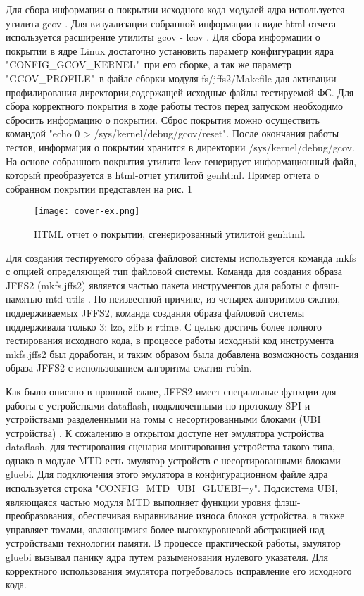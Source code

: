 Для сбора информации о покрытии исходного кода модулей ядра используется утилита gcov \cite{gcov}. Для визуализации собранной информации в виде html отчета используется расширение утилиты gcov - lcov \cite{lcov}. Для сбора информации о покрытии в ядре Linux достаточно установить параметр конфигурации ядра "CONFIG\_GCOV\_KERNEL"\ при его сборке, а так же параметр "GCOV\_PROFILE"\ в файле сборки модуля fs/jffs2/Makefile для активации профилирования директории,содержащей исходные файлы тестируемой ФС. Для сбора корректного покрытия в ходе работы тестов перед запуском необходимо сбросить информацию о покрытии. Сброс покрытия можно осуществить командой  "echo 0 > /sys/kernel/debug/gcov/reset". После окончания работы тестов, информация о покрытии хранится в директории /sys/kernel/debug/gcov. На основе собранного покрытия утилита lcov генерирует информационный файл, который преобразуется в html-отчет утилитой genhtml. Пример отчета о собранном покрытии представлен на рис. \ref{coverexample}

\begin{figure}[H]
	\centering
	\texttt{[image: cover-ex.png]}
	\caption{HTML отчет о покрытии, сгенерированный утилитой genhtml.}
	\label{coverexample}
\end{figure}

Для создания тестируемого образа файловой системы используется команда mkfs с опцией определяющей тип файловой системы. Команда для создания образа JFFS2 (mkfs.jffs2) является частью пакета инструментов для работы с флэш-памятью mtd-utils \cite{mtd-utils}. По неизвестной причине, из четырех алгоритмов сжатия, поддерживаемых JFFS2, команда создания образа файловой системы поддерживала только 3: lzo, zlib и rtime. С целью достичь более полного тестирования исходного кода, в процессе работы исходный код инструмента mkfs.jffs2 был доработан, и таким образом была добавлена возможность создания образа JFFS2 с использованием алгоритма сжатия rubin.

Как было описано в прошлой главе, JFFS2 имеет специальные функции для работы с устройствами dataflash, подключенными по протоколу SPI и устройствами разделенными на томы с несортированными блоками (UBI устройства) \cite{ubi}. К сожалению в открытом доступе нет эмулятора устройства dataflash, для тестирования сценария монтирования устройства такого типа, однако в модуле MTD есть эмулятор устройств с несортированными блоками - gluebi. Для подключения этого эмулятора в конфигурационном файле ядра используется строка "CONFIG\_MTD\_UBI\_GLUEBI=y". Подсистема UBI, являющаяся частью модуля MTD выполняет функции уровня флэш-преобразования, обеспечивая выравнивание износа блоков устройства, а также управляет томами, являющимися более высокоуровневой абстракцией над устройствами технологии памяти. В процессе практической работы, эмулятор gluebi вызывал панику ядра путем разыменования нулевого указателя. Для корректного использования эмулятора потребовалось исправление его исходного кода.

